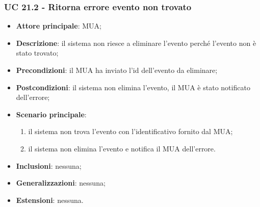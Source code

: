     \subsubsection{UC 21.2 - Ritorna errore evento non trovato} \label{sec:UC21.2}
    \begin{itemize}
        \item \textbf{Attore principale}: MUA;
        \item \textbf{Descrizione}: il sistema non riesce a eliminare l'evento perché l'evento non è stato trovato;
        \item \textbf{Precondizioni}: il MUA ha inviato l'id dell'evento da eliminare;
        \item \textbf{Postcondizioni}: il sistema non elimina l'evento, il MUA è stato notificato dell'errore;
        \item \textbf{Scenario principale}:
            \begin{enumerate}
                \item il sistema non trova l'evento con l'identificativo fornito dal MUA;
                \item il sistema non elimina l'evento e notifica il MUA dell'errore.
            \end{enumerate}
        \item \textbf{Inclusioni}: nessuna;
        \item \textbf{Generalizzazioni}: nessuna;
        \item \textbf{Estensioni}: nessuna.
    \end{itemize}

